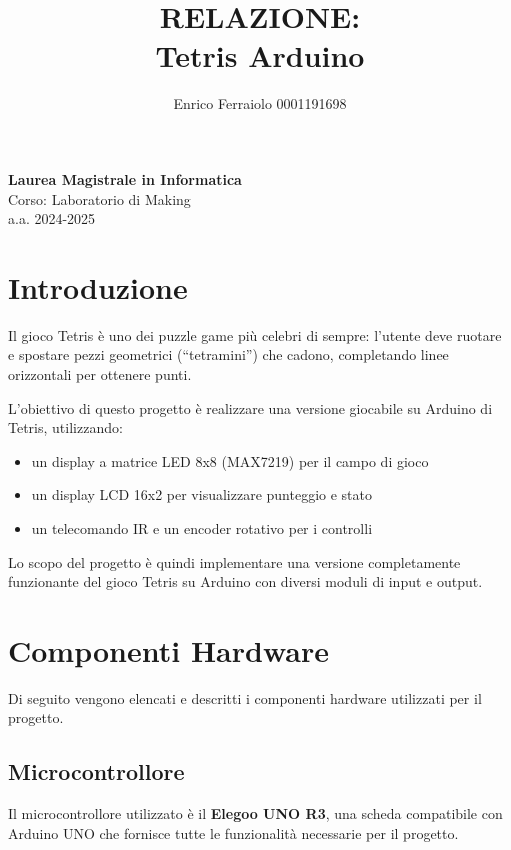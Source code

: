 \documentclass[a4paper, 12pt]{article}
\title{\textbf{RELAZIONE: \\ Tetris Arduino}}
\author{Enrico Ferraiolo 0001191698}
\date{}
\begin{document}
\maketitle

\begin{center}
    \textbf{Laurea Magistrale in Informatica}\\
    \vspace{0.3cm}
    Corso: Laboratorio di Making\\
    a.a. 2024-2025
    \vspace{2cm}
\end{center}

\newpage

\tableofcontents
\newpage

\section{Introduzione}
\label{sec:introduzione}
Il gioco Tetris è uno dei puzzle game più celebri di sempre: l'utente deve ruotare e spostare pezzi geometrici (``tetramini'') che cadono,
completando linee orizzontali per ottenere punti.

L'obiettivo di questo progetto è realizzare una versione giocabile su Arduino di Tetris, utilizzando:
\begin{itemize}
    \item un display a matrice LED 8x8 (MAX7219) per il campo di gioco
    \item un display LCD 16x2 per visualizzare punteggio e stato
    \item un telecomando IR e un encoder rotativo per i controlli
\end{itemize}

Lo scopo del progetto è quindi implementare una versione completamente funzionante del gioco Tetris su Arduino con diversi moduli di input e output.

\section{Componenti Hardware}
\label{sec:componenti-hardware}
Di seguito vengono elencati e descritti i componenti hardware utilizzati per il progetto.

\subsection{Microcontrollore}
\label{subsec:microcontrollore}
Il microcontrollore utilizzato è il \textbf{Elegoo UNO R3}, una scheda compatibile con Arduino UNO che fornisce tutte le funzionalità necessarie per il progetto.
\end{document}
